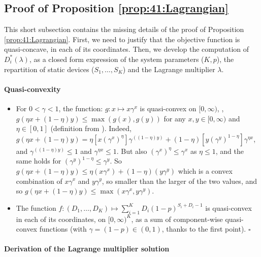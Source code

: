 \subsection{Proof of Proposition \ref{prop:41:Lagrangian}}
\label{sec:5:proofLagrangian}

This short subsection contains the missing details of the proof of Proposition \ref{prop:41:Lagrangian}.
%
First, we need to justify that the objective function is quasi-concave, in each of its coordinates.
%
Then, we develop the computation of $D_i^*(\lambda)$, as a closed form expression of the system parameters ($K, p$), the repartition of static devices ($S_1,\dots,S_{K}$) and the Lagrange multiplier $\lambda$.

\paragraph{Quasi-convexity}

\begin{itemize}
	\item
	For $0 < \gamma < 1$, the function: $g: x \mapsto x \gamma^x$ is quasi-convex on $[0,\infty)$, \ie, $g(\eta x + (1-\eta)y) \leq \max(g(x), g(y))$ for any $x,y \in [0,\infty)$ and $\eta \in [0,1]$ (definition from \cite{Luenberger68}).
    Indeed, $g(\eta x + (1-\eta)y) = \eta \left[ x (\gamma^x)^{\eta} \right] \gamma^{((1-\eta)y)} + (1-\eta)\left[ y (\gamma^y)^{1-\eta}\right] \gamma^{\eta x}$, and $\gamma^{((1-\eta)y)} \leq 1$ and $\gamma^{\eta x} \leq 1$. But also $(\gamma^x)^{\eta} \leq \gamma^x$ as $\eta \leq 1$, and the same holds for $(\gamma^y)^{1-\eta} \leq \gamma^y$. So $g(\eta x + (1-\eta)y) \leq \eta (x \gamma^x) + (1 - \eta) (y \gamma^y)$ which is a convex combination of $x \gamma^x$ and $y \gamma^y$, so smaller than the larger of the two values, and so $g(\eta x + (1-\eta)y) \leq \max(x \gamma^x, y \gamma^y)$.

    \item
    The function $f: (D_1, \dots, D_{K}) \mapsto \sum_{i=1}^{K} D_i (1 - p)^{S_i + D_i -1}$ is quasi-convex in each of its coordinates, on $[0,\infty)^{K}$, as a sum of component-wise quasi-convex functions (with $\gamma = (1 - p) \in (0, 1)$, thanks to the first point).
    \hfill{}$\square$
\end{itemize}


\paragraph{Derivation of the Lagrange multiplier solution}

